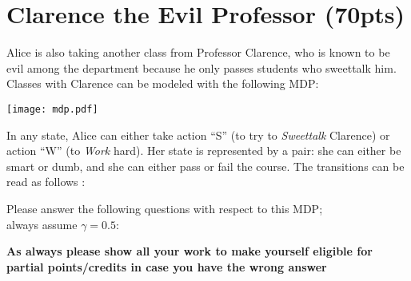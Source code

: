 \documentclass[fleqn]{hw4}
\begin{document}
\newpage

\section{Clarence the Evil Professor (70pts)}

Alice is also taking another class from Professor Clarence, who is known to be evil among the department
because he only passes students who sweettalk him.  Classes with Clarence can be modeled with the following MDP:

\texttt{[image: mdp.pdf]}

In any state, Alice can either take action ``S'' (to try to \emph{Sweettalk} Clarence) or action
``W'' (to \emph{Work} hard).  Her state is represented by a pair: she can either be smart or dumb, 
and she can either pass or fail the course. The transitions can be read as follows :

Please answer the following questions with respect to this MDP; \\
always assume $\gamma = 0.5$:

\textbf{As always please show all your work to make yourself eligible for partial points/credits in case you have the wrong answer}
\end{document}
